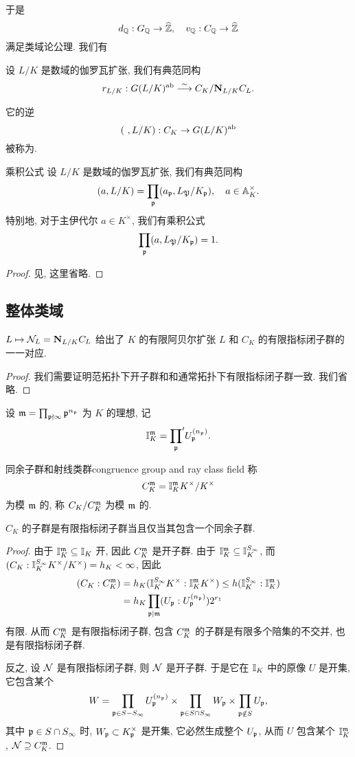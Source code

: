 于是
  \[d_{\mathbb{Q}}:G_{\mathbb{Q}}\to\widehat{{\mathbb{Z}}},\quad v_{\mathbb{Q}}:C_{\mathbb{Q}}\to\widehat{{\mathbb{Z}}}\]
满足类域论公理. 我们有
\begin{theorem}{}{}
设 $L/K$ 是数域的伽罗瓦扩张, 我们有典范同构
  \[r_{L/K}:G(L/K)^{\mathrm{ab}}\stackrel{\sim}{\longrightarrow} C_K/{\mathbf{N}}_{L/K}C_L.\]
\end{theorem}
它的逆
  \[(~,L/K):C_K\to G(L/K)^{\mathrm{ab}}\]
被称为.
\begin{proposition}{乘积公式}{}
设 $L/K$ 是数域的伽罗瓦扩张, 我们有典范同构
  \[(a,L/K)=\prod_{\mathfrak{p}} (a_{\mathfrak{p}},L_{\mathfrak{P}}/K_{\mathfrak{p}}),\quad a\in {\mathbb{A}}_K^\times.\]
特别地, 对于主伊代尔 $a\in K^\times$, 我们有乘积公式
  \[\prod_{\mathfrak{p}}(a,L_{\mathfrak{P}}/K_{\mathfrak{p}})=1.\]
\end{proposition}
\begin{proof}
见\cite[Chapter VI, Proposition~5.6, Corollary~5.7]{Neukirch1999}, 这里省略.
\end{proof}


\subsection{整体类域}
\begin{theorem}{}{}
$L\mapsto {\mathcal{N}}_L={\mathbf{N}}_{L/K}C_L$ 给出了 $K$ 的有限阿贝尔扩张 $L$ 和 $C_K$ 的有限指标闭子群的一一对应.
\end{theorem}
\begin{proof}
我们需要证明范拓扑下开子群和和通常拓扑下有限指标闭子群一致. 我们省略.
\end{proof}

设 ${\mathfrak{m}}=\prod_{{\mathfrak{p}}\nmid\infty}{\mathfrak{p}}^{n_{\mathfrak{p}}}$ 为 $K$ 的理想, 记
  \[{\mathbb{I}}_K^{\mathfrak{m}}={\prod_{\mathfrak{p}}}' U_{\mathfrak{p}}^{(n_{\mathfrak{p}})}.\]

\begin{definition}{同余子群和射线类群}{congruence group and ray class field}
称
  \[C_K^{\mathfrak{m}}={\mathbb{I}}_K^{\mathfrak{m}} K^\times/K^\times\]
为模 ${\mathfrak{m}}$ 的, 称 $C_K/C_K^{\mathfrak{m}}$ 为模 ${\mathfrak{m}}$ 的.
\end{definition}

\begin{proposition}{}{}
$C_K$ 的子群是有限指标闭子群当且仅当其包含一个同余子群.
\end{proposition}
\begin{proof}
由于 ${\mathbb{I}}_K^{\mathfrak{m}}\subseteq {\mathbb{I}}_K$ 开, 因此 $C_K^{\mathfrak{m}}$ 是开子群. 由于 ${\mathbb{I}}_K^{\mathfrak{m}}\subseteq {\mathbb{I}}_K^{S_\infty}$, 而 $(C_K:{\mathbb{I}}_K^{S_\infty}K^\times/K^\times)=h_K<\infty$, 因此
  \[\begin{split}
(C_K:C_K^{\mathfrak{m}})&=h_K({\mathbb{I}}_K^{S_\infty}K^\times:{\mathbb{I}}_K^{\mathfrak{m}} K^\times)\le h({\mathbb{I}}_K^{S_\infty}:{\mathbb{I}}_K^{\mathfrak{m}})\\
&=h_K\prod_{{\mathfrak{p}}\mid{\mathfrak{m}}} (U_{\mathfrak{p}}:U_{\mathfrak{p}}^{(n_{\mathfrak{p}})})2^{r_1}
\end{split}\]
有限. 从而 $C_K^{\mathfrak{m}}$ 是有限指标闭子群, 包含 $C_K^{\mathfrak{m}}$ 的子群是有限多个陪集的不交并, 也是有限指标闭子群.

反之, 设 ${\mathcal{N}}$ 是有限指标闭子群, 则 ${\mathcal{N}}$ 是开子群. 于是它在 ${\mathbb{I}}_K$ 中的原像 $U$ 是开集, 它包含某个
  \[W=\prod_{{\mathfrak{p}}\in S-S_\infty}U_{\mathfrak{p}}^{(n_{\mathfrak{p}})}\times\prod_{{\mathfrak{p}}\in S\cap S_\infty}W_{\mathfrak{p}} \times\prod_{{\mathfrak{p}}\notin S}U_{\mathfrak{p}},\]
其中 ${\mathfrak{p}}\in S\cap S_\infty$ 时, $W_{\mathfrak{p}}\subset K_{\mathfrak{p}}^\times$ 是开集, 它必然生成整个 $U_{\mathfrak{p}}$, 从而 $U$ 包含某个 ${\mathbb{I}}_K^{\mathfrak{m}}$, ${\mathcal{N}}\supseteq C_K^{\mathfrak{m}}$.
\end{proof}

